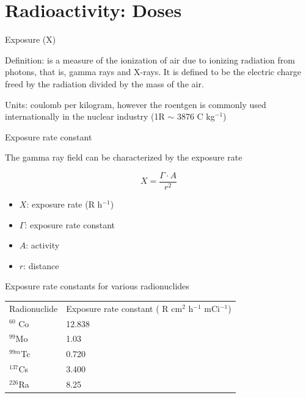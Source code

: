 \section{Radioactivity: Doses}

\frame{\tableofcontents[currentsection]}

\begin{frame}{Exposure (X)}

\alert{Definition}:  is a measure of the ionization of air due to ionizing radiation from photons, that is, gamma rays and X-rays.  It is defined to be the electric charge freed by the radiation divided by the mass of the air.

\alert{Units}: coulomb per kilogram, however the roentgen is commonly used internationally in the nuclear industry (1R $\sim$ 3876 C kg$^{-1}$)

\end{frame}

\begin{frame}{Exposure rate constant}

\alert{The gamma ray field can be characterized by the exposure rate}

\begin{block}{}

\[X=\frac{\Gamma\cdot A}{r^2}\]

\end{block}

\begin{block}{}
\begin{itemize}
\item $X$: exposure rate (R h$^{-1}$)
\item $\Gamma$: exposure rate constant
\item $A$: activity 
\item $r$: distance 
\end{itemize}
\end{block}

\end{frame}



\begin{frame}{Exposure rate constants for various radionuclides}

\begin{table}[H]
\vskip -0.5cm
\begin{center}
  \begin{tabular}{p{3cm}p{3.8cm}}
  \toprule
  Radionuclide & Exposure rate constant (	R cm$^2$ h$^{-1}$ mCi$^{-1}$)  \\ \otoprule
$^{60}$ Co & 12.838 \\
$^{99}$Mo & 1.03\\
$^{99m}$Tc & 0.720\\
$^{137}$Cs & 3.400\\
$^{226}$Ra & 8.25
  \\ \bottomrule
\end{tabular}
\end{center}
\end{table}

\end{frame}

